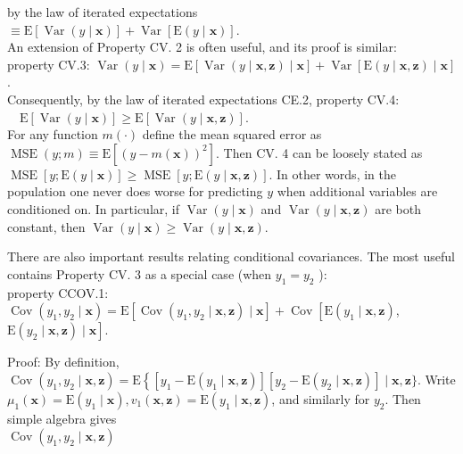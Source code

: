\documentclass[10pt]{article}
\begin{document}
by the law of iterated expectations\\
$\equiv \mathrm{E}[\operatorname{Var}(y \mid \mathbf{x})]+\operatorname{Var}[\mathrm{E}(y \mid \mathbf{x})]$.\\
An extension of Property CV. 2 is often useful, and its proof is similar:\\
property CV.3: $\operatorname{Var}(y \mid \mathbf{x})=\mathrm{E}[\operatorname{Var}(y \mid \mathbf{x}, \mathbf{z}) \mid \mathbf{x}]+\operatorname{Var}[\mathrm{E}(y \mid \mathbf{x}, \mathbf{z}) \mid \mathbf{x}]$.\\
Consequently, by the law of iterated expectations CE.2, property CV.4: $\quad \mathrm{E}[\operatorname{Var}(y \mid \mathbf{x})] \geq \mathrm{E}[\operatorname{Var}(y \mid \mathbf{x}, \mathbf{z})]$.\\
For any function $m(\cdot)$ define the mean squared error as $\operatorname{MSE}(y ; m) \equiv \mathrm{E}\left[(y-m(\mathbf{x}))^{2}\right]$. Then CV. 4 can be loosely stated as $\operatorname{MSE}[y ; \mathrm{E}(y \mid \mathbf{x})] \geq \operatorname{MSE}[y ; \mathrm{E}(y \mid \mathbf{x}, \mathbf{z})]$. In other words, in the population one never does worse for predicting $y$ when additional variables are conditioned on. In particular, if $\operatorname{Var}(y \mid \mathbf{x})$ and $\operatorname{Var}(y \mid \mathbf{x}, \mathbf{z})$ are both constant, then $\operatorname{Var}(y \mid \mathbf{x}) \geq \operatorname{Var}(y \mid \mathbf{x}, \mathbf{z})$.

There are also important results relating conditional covariances. The most useful contains Property CV. 3 as a special case (when $y_{1}=y_{2}$ ):\\
property CCOV.1: $\operatorname{Cov}\left(y_{1}, y_{2} \mid \mathbf{x}\right)=\mathrm{E}\left[\operatorname{Cov}\left(y_{1}, y_{2} \mid \mathbf{x}, \mathbf{z}\right) \mid \mathbf{x}\right]+\operatorname{Cov}\left[\mathrm{E}\left(y_{1} \mid \mathbf{x}, \mathbf{z}\right)\right.$, $\left.\mathrm{E}\left(y_{2} \mid \mathbf{x}, \mathbf{z}\right) \mid \mathbf{x}\right]$.

Proof: By definition, $\operatorname{Cov}\left(y_{1}, y_{2} \mid \mathbf{x}, \mathbf{z}\right)=\mathrm{E}\left\{\left[y_{1}-\mathrm{E}\left(y_{1} \mid \mathbf{x}, \mathbf{z}\right)\right]\left[y_{2}-\mathrm{E}\left(y_{2} \mid \mathbf{x}, \mathbf{z}\right)\right] \mid\right. \mathbf{x}, \mathbf{z}\}$. Write $\mu_{1}(\mathbf{x})=\mathrm{E}\left(y_{1} \mid \mathbf{x}\right), v_{1}(\mathbf{x}, \mathbf{z})=\mathrm{E}\left(y_{1} \mid \mathbf{x}, \mathbf{z}\right)$, and similarly for $y_{2}$. Then simple algebra gives\\
$\operatorname{Cov}\left(y_{1}, y_{2} \mid \mathbf{x}, \mathbf{z}\right)$
\end{document}
